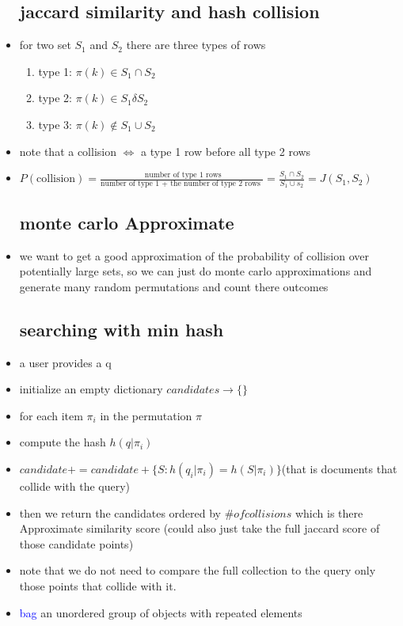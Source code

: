 \documentclass{article}
\begin{document}
\begin{itemize}
\subsection*{jaccard similarity and hash collision}
\item for two set $S_1$ and $S_2$ there are three types of rows
\begin{enumerate}
    \item type 1: $\pi(k)\in S_{1}\cap S_{2}$
    \item type 2: $\pi(k)\in S_{1}\delta S_{2}$
    \item type 3: $\pi(k)\not \in S_{1}\cup S_{2}$
\end{enumerate}
\item note that a collision $\iff$ a type 1 row before all type 2 rows 
\item $P(\text{collision})=\frac{\text{ number  of type 1 rows}}{\text{number of type 1 + the number of type 2 rows }}=\frac{S_1\cap S_2}{S_1\cup s_2}=J(S_1,S_2)$
\subsection*{monte carlo Approximate}
\item we want to get a good approximation of the probability of collision over potentially large sets, so we can just do monte carlo approximations and generate many random permutations and count there outcomes  
\subsection*{searching with min hash}
\item a user provides a q 
\item initialize an empty dictionary $candidates \rightarrow \{\}$
\item for each item $\pi_i$ in the permutation $\pi$
\item compute the hash $h(q|\pi_i)$
\item $candidate +=candidate + \{S:h(q_i|\pi_i)=h(S|\pi_i)\} $(that is documents that collide with the query)
\item then we return the candidates ordered by $\# of collisions $ which is there Approximate similarity score (could also just take the full jaccard score of those candidate points)
\item note that we do not need to compare the full collection to the query only those points that collide with it. 
\item \textcolor{blue}{bag} an unordered group of objects with repeated elements

\end{itemize}
\end{document}
